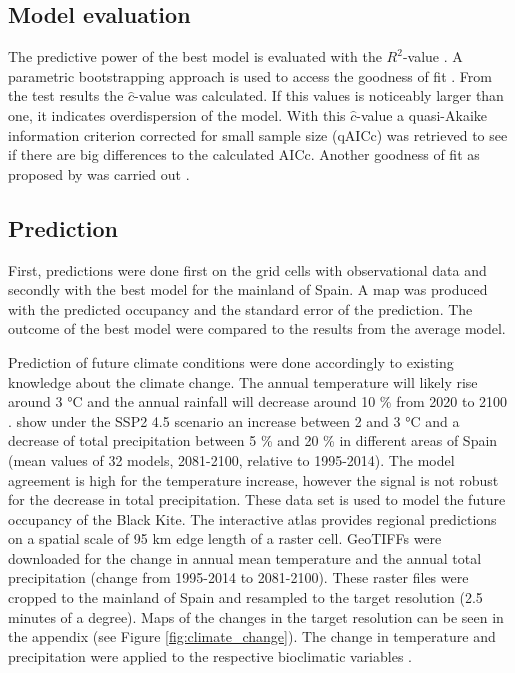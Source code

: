 \begin{multicols}{2}
\subsection*{Model evaluation}
The predictive power of the best model is evaluated with the $R^2$-value \parencite{Nagelkerke1991}. A parametric bootstrapping approach is used to access the goodness of fit \parencite["parboot" function as implemented in][]{unmarked}. From the test results the $\hat{c}$-value was calculated. If this values is noticeably larger than one, it indicates overdispersion of the model. With this $\hat{c}$-value a quasi-Akaike information criterion corrected for small sample size (qAICc) was retrieved to see if there are big differences to the calculated AICc. Another goodness of fit as proposed by \textcite{MacKenzie2004} was carried out \parencite[implemented in][]{AICcmodavg}.


\subsection*{Prediction}
First, predictions were done first on the grid cells with observational data and secondly with the best model for the mainland of Spain. A map was produced with the predicted occupancy and the standard error of the prediction. The outcome of the best model were compared to the results from the average model. 
 
Prediction of future climate conditions were done accordingly to existing knowledge about the climate change. The annual temperature will likely rise around 3 °C and the annual rainfall will decrease around 10 \% from 2020 to 2100 \parencite{aemet}. \textcite{ipcc} show under the SSP2 4.5 scenario \parencite{Riahi2017} an increase between 2 and 3 °C and a decrease of total precipitation between 5 \% and 20 \% in different areas of Spain (mean values of 32 models, 2081-2100, relative to 1995-2014). The model agreement is high for the temperature increase, however the signal is not robust for the decrease in total precipitation. These data set is used to model the future occupancy of the Black Kite. The interactive atlas provides regional predictions on a spatial scale of 95 km edge length of a raster cell. GeoTIFFs were downloaded for the change in annual mean temperature and the annual total precipitation (change from 1995-2014 to 2081-2100). These raster files were cropped to the mainland of Spain and resampled to the target resolution (2.5 minutes of a degree). Maps of the changes in the target resolution can be seen in the appendix (see Figure \ref{fig:climate_change}). The change in temperature and precipitation were applied to the respective bioclimatic variables \parencite{Fick2017}. 


\end{multicols}
